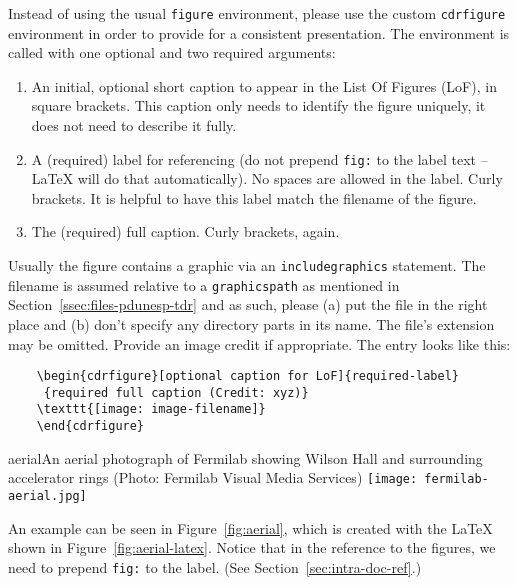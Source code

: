 Instead of using the usual \texttt{figure} environment, please use the custom \texttt{cdrfigure}
environment in order to provide for a consistent presentation.
The environment is called with one optional and two required
arguments:

\begin{enumerate}
\item An initial, optional short caption to appear in the List Of Figures (LoF), in square brackets. This caption only needs to
identify the figure uniquely, it does not need to describe it fully.
\item A (required) label for referencing (do not prepend \texttt{fig:} to the label text --  \LaTeX{} will do that automatically). No spaces are allowed in the label. Curly brackets. It is helpful to have this label match the filename of the figure. 
\item The (required) full caption. Curly brackets, again.
\end{enumerate}

Usually the figure contains a graphic via an \texttt{includegraphics} statement.
The filename is assumed relative to a \texttt{graphicspath} as
mentioned in Section~\ref{ssec:files-pdunesp-tdr} and as such, please (a) put the file in the right place and (b) don't
 specify any directory parts in its name.
The file's extension may be omitted. Provide an image credit if appropriate. The entry looks like this:

\begin{verbatim}
    \begin{cdrfigure}[optional caption for LoF]{required-label}
     {required full caption (Credit: xyz)}
    \texttt{[image: image-filename]}
    \end{cdrfigure}
\end{verbatim}



\begin{cdrfigure}{aerial}{An aerial photograph of Fermilab
    showing Wilson Hall and surrounding accelerator rings (Photo: Fermilab
    Visual Media Services)}
  \texttt{[image: fermilab-aerial.jpg]}
\end{cdrfigure}


An example can be seen in Figure~\ref{fig:aerial}, which is created
with the \LaTeX{} shown in Figure~\ref{fig:aerial-latex}.  Notice that in the reference to the figures, we need to prepend \texttt{fig:} to the label. (See Section~\ref{sec:intra-doc-ref}.)

